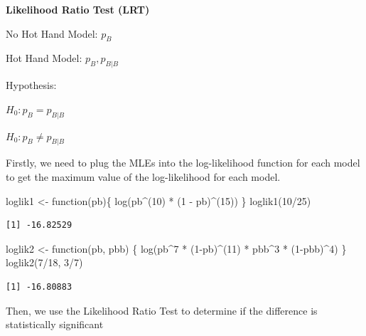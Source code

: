 \documentclass[
  letterpaper,
  DIV=11,
  numbers=noendperiod]{scrartcl}
\newenvironment{Shaded}{\begin{snugshade}}{\end{snugshade}}
\newcommand{\ControlFlowTok}[1]{\textcolor[rgb]{0.00,0.23,0.31}{#1}}
\newcommand{\DecValTok}[1]{\textcolor[rgb]{0.68,0.00,0.00}{#1}}
\newcommand{\FunctionTok}[1]{\textcolor[rgb]{0.28,0.35,0.67}{#1}}
\newcommand{\NormalTok}[1]{\textcolor[rgb]{0.00,0.23,0.31}{#1}}
\newcommand{\OtherTok}[1]{\textcolor[rgb]{0.00,0.23,0.31}{#1}}
\newcommand{\SpecialCharTok}[1]{\textcolor[rgb]{0.37,0.37,0.37}{#1}}
\begin{document}
\textbf{Likelihood Ratio Test (LRT)}

No Hot Hand Model: \(p_B\)

Hot Hand Model: \(p_B, p_{B \vert B}\)

Hypothesis:

\(H_0:p_B=p_{B \vert B}\)

\(H_0:p_B \neq p_{B \vert B}\)

Firstly, we need to plug the MLEs into the log-likelihood function for
each model to get the maximum value of the log-likelihood for each
model.

\begin{Shaded}
\begin{Highlighting}[]
\NormalTok{loglik1 }\OtherTok{\textless{}{-}} \ControlFlowTok{function}\NormalTok{(pb)\{}
  \FunctionTok{log}\NormalTok{(pb}\SpecialCharTok{\^{}}\NormalTok{(}\DecValTok{10}\NormalTok{) }\SpecialCharTok{*}\NormalTok{ (}\DecValTok{1} \SpecialCharTok{{-}}\NormalTok{ pb)}\SpecialCharTok{\^{}}\NormalTok{(}\DecValTok{15}\NormalTok{))}
\NormalTok{\}}
\FunctionTok{loglik1}\NormalTok{(}\DecValTok{10}\SpecialCharTok{/}\DecValTok{25}\NormalTok{)}
\end{Highlighting}
\end{Shaded}

\begin{verbatim}
[1] -16.82529
\end{verbatim}

\begin{Shaded}
\begin{Highlighting}[]
\NormalTok{loglik2 }\OtherTok{\textless{}{-}} \ControlFlowTok{function}\NormalTok{(pb, pbb) \{}
  \FunctionTok{log}\NormalTok{(pb}\SpecialCharTok{\^{}}\DecValTok{7} \SpecialCharTok{*}\NormalTok{ (}\DecValTok{1}\SpecialCharTok{{-}}\NormalTok{pb)}\SpecialCharTok{\^{}}\NormalTok{(}\DecValTok{11}\NormalTok{) }\SpecialCharTok{*}\NormalTok{ pbb}\SpecialCharTok{\^{}}\DecValTok{3} \SpecialCharTok{*}\NormalTok{ (}\DecValTok{1}\SpecialCharTok{{-}}\NormalTok{pbb)}\SpecialCharTok{\^{}}\DecValTok{4}\NormalTok{)}
\NormalTok{\}}
\FunctionTok{loglik2}\NormalTok{(}\DecValTok{7}\SpecialCharTok{/}\DecValTok{18}\NormalTok{, }\DecValTok{3}\SpecialCharTok{/}\DecValTok{7}\NormalTok{)}
\end{Highlighting}
\end{Shaded}

\begin{verbatim}
[1] -16.80883
\end{verbatim}

Then, we use the Likelihood Ratio Test to determine if the difference is
statistically significant
\end{document}
